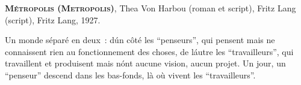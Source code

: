 \begin{thebibliography}{2}
  \textsc{\textbf{Métropolis (Metropolis)}},
  Thea Von Harbou (roman et script), Fritz Lang (script), Fritz Lang,
  1927.\newline
  {\advance\baselineskip -3pt {\scriptsize Un monde séparé en deux~: d\'un côté les “penseurs”, qui pensent mais ne connaissent rien au fonctionnement des choses, de l\'autre les “travailleurs”, qui travaillent et produisent mais n\'ont aucune vision, aucun projet. Un jour, un “penseur” descend dans les bas-fonds, là où vivent les “travailleurs”.} \par}
  
\end{thebibliography}